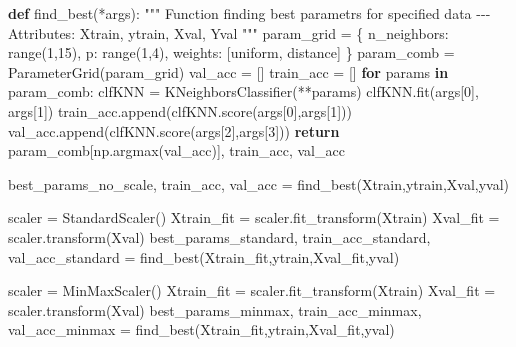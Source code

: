 \documentclass[
  letterpaper,
  DIV=11,
  numbers=noendperiod]{scrartcl}
\newenvironment{Shaded}{\begin{snugshade}}{\end{snugshade}}
\newcommand{\BuiltInTok}[1]{\textcolor[rgb]{0.00,0.23,0.31}{#1}}
\newcommand{\CommentTok}[1]{\textcolor[rgb]{0.37,0.37,0.37}{#1}}
\newcommand{\ControlFlowTok}[1]{\textcolor[rgb]{0.00,0.23,0.31}{\textbf{#1}}}
\newcommand{\DecValTok}[1]{\textcolor[rgb]{0.68,0.00,0.00}{#1}}
\newcommand{\KeywordTok}[1]{\textcolor[rgb]{0.00,0.23,0.31}{\textbf{#1}}}
\newcommand{\NormalTok}[1]{\textcolor[rgb]{0.00,0.23,0.31}{#1}}
\newcommand{\OperatorTok}[1]{\textcolor[rgb]{0.37,0.37,0.37}{#1}}
\newcommand{\StringTok}[1]{\textcolor[rgb]{0.13,0.47,0.30}{#1}}
\begin{document}
\begin{Shaded}
\begin{Highlighting}[]
\KeywordTok{def}\NormalTok{ find\_best(}\OperatorTok{*}\NormalTok{args):}
    \CommentTok{""" Function finding best parametrs for specified data}
\CommentTok{    {-}{-}{-}}
\CommentTok{    Attributes:}
\CommentTok{    Xtrain, ytrain, Xval, Yval}
\CommentTok{    """}
\NormalTok{    param\_grid }\OperatorTok{=}\NormalTok{ \{}
        \StringTok{\textquotesingle{}n\_neighbors\textquotesingle{}}\NormalTok{: }\BuiltInTok{range}\NormalTok{(}\DecValTok{1}\NormalTok{,}\DecValTok{15}\NormalTok{), }
        \StringTok{\textquotesingle{}p\textquotesingle{}}\NormalTok{: }\BuiltInTok{range}\NormalTok{(}\DecValTok{1}\NormalTok{,}\DecValTok{4}\NormalTok{),}
        \StringTok{\textquotesingle{}weights\textquotesingle{}}\NormalTok{: [}\StringTok{\textquotesingle{}uniform\textquotesingle{}}\NormalTok{, }\StringTok{\textquotesingle{}distance\textquotesingle{}}\NormalTok{]}
\NormalTok{    \}}
\NormalTok{    param\_comb }\OperatorTok{=}\NormalTok{ ParameterGrid(param\_grid)}
\NormalTok{    val\_acc }\OperatorTok{=}\NormalTok{ []}
\NormalTok{    train\_acc }\OperatorTok{=}\NormalTok{ []}
    \ControlFlowTok{for}\NormalTok{ params }\KeywordTok{in}\NormalTok{ param\_comb:}
\NormalTok{        clfKNN }\OperatorTok{=}\NormalTok{ KNeighborsClassifier(}\OperatorTok{**}\NormalTok{params)}
\NormalTok{        clfKNN.fit(args[}\DecValTok{0}\NormalTok{], args[}\DecValTok{1}\NormalTok{])}
\NormalTok{        train\_acc.append(clfKNN.score(args[}\DecValTok{0}\NormalTok{],args[}\DecValTok{1}\NormalTok{]))}
\NormalTok{        val\_acc.append(clfKNN.score(args[}\DecValTok{2}\NormalTok{],args[}\DecValTok{3}\NormalTok{]))}
    \ControlFlowTok{return}\NormalTok{ param\_comb[np.argmax(val\_acc)], train\_acc, val\_acc}
\end{Highlighting}
\end{Shaded}

\begin{Shaded}
\begin{Highlighting}[]
\NormalTok{best\_params\_no\_scale, train\_acc, val\_acc }\OperatorTok{=}\NormalTok{ find\_best(Xtrain,ytrain,Xval,yval)}

\NormalTok{scaler }\OperatorTok{=}\NormalTok{ StandardScaler()}
\NormalTok{Xtrain\_fit }\OperatorTok{=}\NormalTok{ scaler.fit\_transform(Xtrain)}
\NormalTok{Xval\_fit }\OperatorTok{=}\NormalTok{ scaler.transform(Xval)}
\NormalTok{best\_params\_standard, train\_acc\_standard, val\_acc\_standard }\OperatorTok{=}\NormalTok{ find\_best(Xtrain\_fit,ytrain,Xval\_fit,yval)}

\NormalTok{scaler }\OperatorTok{=}\NormalTok{ MinMaxScaler()}
\NormalTok{Xtrain\_fit }\OperatorTok{=}\NormalTok{ scaler.fit\_transform(Xtrain)}
\NormalTok{Xval\_fit }\OperatorTok{=}\NormalTok{ scaler.transform(Xval)}
\NormalTok{best\_params\_minmax, train\_acc\_minmax, val\_acc\_minmax }\OperatorTok{=}\NormalTok{ find\_best(Xtrain\_fit,ytrain,Xval\_fit,yval)}
\end{Highlighting}
\end{Shaded}
\end{document}
